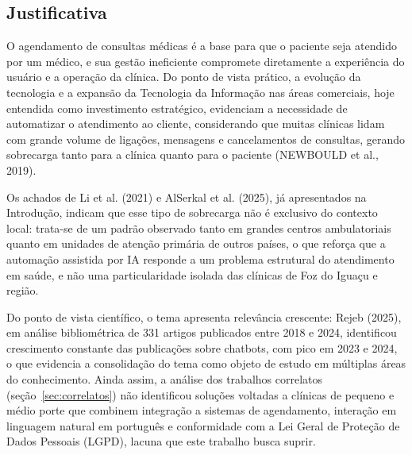 \documentclass[12pt,a4paper]{extarticle}
\begin{document}
\subsection{Justificativa}
O agendamento de consultas médicas é a base para que o paciente seja atendido por um médico, e sua gestão ineficiente compromete diretamente a experiência do usuário e a operação da clínica. Do ponto de vista prático, a evolução da tecnologia e a expansão da Tecnologia da Informação nas áreas comerciais, hoje entendida como investimento estratégico, evidenciam a necessidade de automatizar o atendimento ao cliente, considerando que muitas clínicas lidam com grande volume de ligações, mensagens e cancelamentos de consultas, gerando sobrecarga tanto para a clínica quanto para o paciente (NEWBOULD et al., 2019).


Os achados de Li et al. (2021) e AlSerkal et al. (2025), já apresentados na Introdução, indicam que esse tipo de sobrecarga não é exclusivo do contexto local: trata-se de um padrão observado tanto em grandes centros ambulatoriais quanto em unidades de atenção primária de outros países, o que reforça que a automação assistida por IA responde a um problema estrutural do atendimento em saúde, e não uma particularidade isolada das clínicas de Foz do Iguaçu e região.

Do ponto de vista científico, o tema apresenta relevância crescente: Rejeb (2025), em análise bibliométrica de 331 artigos publicados entre 2018 e 2024, identificou crescimento constante das publicações sobre chatbots, com pico em 2023 e 2024, o que evidencia a consolidação do tema como objeto de estudo em múltiplas áreas do conhecimento. Ainda assim, a análise dos trabalhos correlatos (seção~\ref{sec:correlatos}) não identificou soluções voltadas a clínicas de pequeno e médio porte que combinem integração a sistemas de agendamento, interação em linguagem natural em português e conformidade com a Lei Geral de Proteção de Dados Pessoais (LGPD), lacuna que este trabalho busca suprir.
\end{document}
